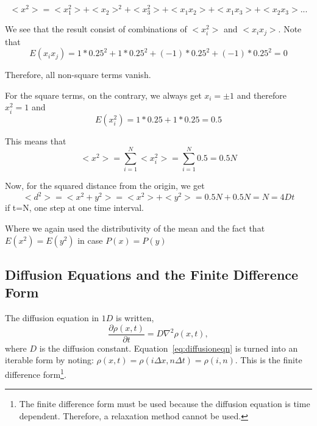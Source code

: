 \documentclass[12pt]{article}
\begin{document}
\begin{equation}
    <x^2>=<x_1^2>+<x_2>^2+<x_3^2>+<x_1x_2>+<x_1x_3>+<x_2x_3>...
\end{equation}

We see that the result consist of combinations of $<x_i^2>$ and $<x_ix_j>$. Note that 
\begin{equation}
    E(x_ix_j)=1*0.25^2+1*0.25^2+(-1)*0.25^2+(-1)*0.25^2=0
\end{equation}

Therefore, all non-square terms vanish.

For the square terms, on the contrary, we always get $x_i=\pm 1$ and therefore $x_i^2=1$ and
\begin{equation}
    E(x_i^2)=1*0.25+1*0.25=0.5
\end{equation}

This means that 
\begin{equation}
    <x^2>=\sum_{i=1}^N <x_i^2>=\sum_{i=1}^N 0.5=0.5N
\end{equation}

Now, for the squared distance from the origin, we get
\begin{equation}
    <d^2>=<x^2+y^2>=<x^2>+<y^2>=0.5N+0.5N=N=4Dt
\end{equation}
if t=N, one step at one time interval.

Where we again used the distributivity of the mean and the fact that $E(x^2)=E(y^2)$ in case $P(x)=P(y)$


\subsection{Diffusion Equations and the Finite Difference Form}
\label{sec:diffusionequation}
The diffusion equation in $1D$ is written,
\begin{equation}
  \label{eq:diffusioneqn}
  \frac{\partial\rho(x,t)}{\partial t} = D\nabla^2\rho(x,t),
\end{equation}
where $D$ is the diffusion constant. Equation~\ref{eq:diffusioneqn} is turned into an iterable form by noting: $\rho(x,t) = \rho(i\Delta x, n\Delta t) = \rho(i,n)$. This is the finite difference form\footnote{The finite difference form must be used because the diffusion equation is time dependent. Therefore, a relaxation method cannot be used.}.
\end{document}
